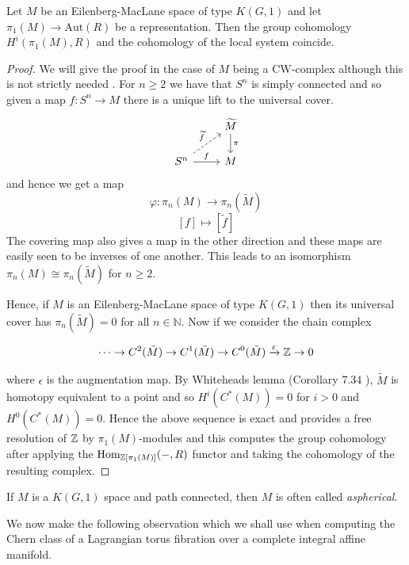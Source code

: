 \begin{lemma}\label{lemma:equiv_localsystem-group}
    Let $M$ be an Eilenberg-MacLane space of type $K(G,1)$ and let $\pi_1(M) \to \text{Aut}(R)$ be a representation. Then the
    group cohomology $H^i(\pi_1(M), R)$ and the cohomology of the local system coincide.
\end{lemma}

\begin{proof}
    We will give the proof in the case of $M$ being a CW-complex although this is not strictly needed \cite{whitehead1978elements}. For $n\geq 2$ we have that $S^n$ is simply connected and so given a map $f: S^n \to M$ there is a unique lift to the universal cover.
    \[
        \begin{tikzcd}
            & \widetilde{M} \arrow[d, "\pi"] \\
            S^n \arrow[ru, dashed, "\widetilde{f}"] \arrow[r, "f"] & M
        \end{tikzcd}
    \]
    and hence we get a map $$ \varphi : \pi_n(M) \to \pi_n(\tilde{M}) $$ $$ [f]
        \mapsto [\widetilde{f}] $$ The covering map also gives a map in the other
    direction and these maps are easily seen to be inverses of one another. This
    leads to an isomorphism $\pi_n(M) \cong \pi_n(\tilde{M})$ for $n \geq 2$.

    Hence, if $M$ is an Eilenberg-MacLane space of type $K(G,1)$ then its universal
    cover has $\pi_n(\tilde{M})=0$ for all $n \in \mathbb{N}$. Now if we consider
    the chain complex

    $$
        \dots \to C^2(\tilde{M}) \to C^1(\tilde{M}) \to C^0(\tilde{M}) \xrightarrow{\varepsilon} \mathbb{Z} \to 0
    $$

    where $\epsilon$ is the augmentation map. By Whiteheads lemma (Corollary 7.34
    \cite{Davis2001LectureNI}), $\tilde{M}$ is homotopy equivalent to a point and
    so $H^i(C^*(M)) = 0$ for $i>0$ and $H^0(C^*(M)) = 0$. Hence the above sequence
    is exact and provides a free resolution of $\mathbb{Z}$ by $\pi_1(M)$-modules and this
    computes the group cohomology after applying the $\text{Hom}_{\mathbb{Z}[\pi_1(M)]}(-,
        R)$ functor and taking the cohomology of the resulting complex.
\end{proof}

\begin{remark}
    If $M$ is a $K(G,1)$ space and path connected, then $M$ is often called \emph{aspherical}.
\end{remark}

We now make the following observation which we shall use when computing the
Chern class of a Lagrangian torus fibration over a complete integral affine
manifold.

